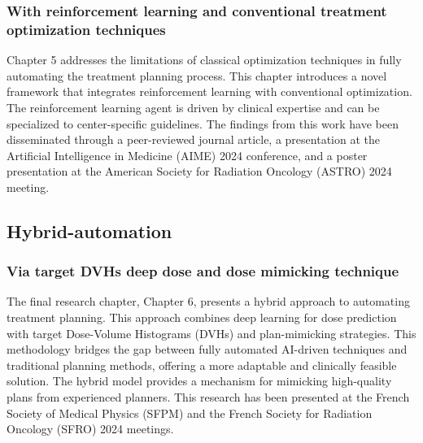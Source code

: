 \subsubsection*{With reinforcement learning and conventional treatment optimization techniques}
Chapter 5 addresses the limitations of classical optimization techniques in fully automating the treatment planning process.
This chapter introduces a novel framework that integrates reinforcement learning with conventional optimization.
The reinforcement learning agent is driven by clinical expertise and can be specialized to center-specific guidelines.
The findings from this work have been disseminated through a peer-reviewed journal article, a presentation at the Artificial Intelligence in Medicine (AIME) 2024 conference, and a poster presentation at the American Society for Radiation Oncology (ASTRO) 2024 meeting.

\subsection{Hybrid-automation}
\subsubsection*{Via target DVHs deep dose and dose mimicking technique}
The final research chapter, Chapter 6, presents a hybrid approach to automating treatment planning.
This approach combines deep learning for dose prediction with target Dose-Volume Histograms (DVHs) and plan-mimicking strategies.
This methodology bridges the gap between fully automated AI-driven techniques and traditional planning methods, offering a more adaptable and clinically feasible solution.
The hybrid model provides a mechanism for mimicking high-quality plans from experienced planners.
This research has been presented at the French Society of Medical Physics (SFPM) and the French Society for Radiation Oncology (SFRO) 2024 meetings.
